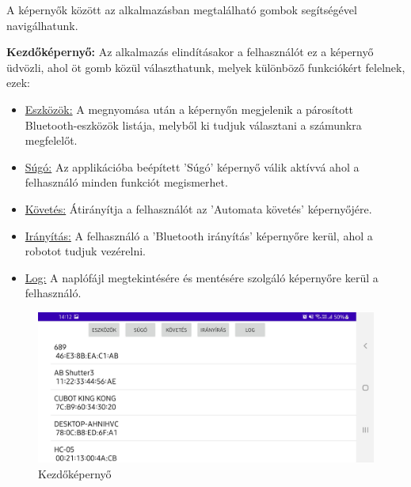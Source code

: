 \documentclass[]{thesis-ekf}
\theoremstyle{definition}
\begin{document}
A képernyők között az alkalmazásban megtalálható gombok segítségével navigálhatunk.

\textbf{Kezdőképernyő:} Az alkalmazás elindításakor a felhasználót ez a képernyő üdvözli, ahol öt gomb közül választhatunk, melyek különböző funkciókért felelnek, ezek:
\begin{itemize}
	\item \underline{Eszközök:} A megnyomása után a képernyőn megjelenik a párosított Bluetooth-eszközök listája, melyből ki tudjuk választani a számunkra megfelelőt.
	\item \underline{Súgó:} Az applikációba beépített ’Súgó’ képernyő válik aktívvá ahol a felhasználó minden funkciót megismerhet.
	\item \underline{Követés:} Átirányítja a felhasználót az ’Automata követés’ képernyőjére.
	\item \underline{Irányítás:} A felhasználó a ’Bluetooth irányítás’ képernyőre kerül, ahol a robotot tudjuk vezérelni.
	\item \underline{Log:} A naplófájl megtekintésére és mentésére szolgáló képernyőre kerül a felhasználó.
\end{itemize}
\begin{figure}[h]
	\centering
	\includegraphics[width=\columnwidth]{images/app_screen/home_screen}
	\caption{Kezdőképernyő}
	\label{home-screen}
\end{figure}
\end{document}
